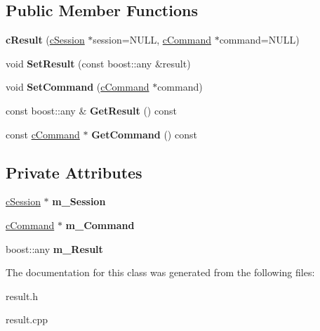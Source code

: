 \subsection*{\-Public \-Member \-Functions}
\begin{DoxyCompactItemize}
\item 
\hypertarget{classengine_1_1cResult_a31310dd255e30fdaeb34aa0e82c489f3}{
{\bfseries c\-Result} (\hyperlink{classengine_1_1cSession}{c\-Session} $\ast$session=\-N\-U\-L\-L, \hyperlink{classengine_1_1cCommand}{c\-Command} $\ast$command=\-N\-U\-L\-L)}
\label{classengine_1_1cResult_a31310dd255e30fdaeb34aa0e82c489f3}

\item 
\hypertarget{classengine_1_1cResult_ad72c10e84728768e45adbe9a653e4295}{
void {\bfseries \-Set\-Result} (const boost\-::any \&result)}
\label{classengine_1_1cResult_ad72c10e84728768e45adbe9a653e4295}

\item 
\hypertarget{classengine_1_1cResult_ae9d0c2817585874e55a9ba8483e9d0b7}{
void {\bfseries \-Set\-Command} (\hyperlink{classengine_1_1cCommand}{c\-Command} $\ast$command)}
\label{classengine_1_1cResult_ae9d0c2817585874e55a9ba8483e9d0b7}

\item 
\hypertarget{classengine_1_1cResult_ab1b5a9a971a31c6bfe9c1deeab868476}{
const boost\-::any \& {\bfseries \-Get\-Result} () const }
\label{classengine_1_1cResult_ab1b5a9a971a31c6bfe9c1deeab868476}

\item 
\hypertarget{classengine_1_1cResult_aa414e0f8b867fa54c6e836f0a67517b0}{
const \hyperlink{classengine_1_1cCommand}{c\-Command} $\ast$ {\bfseries \-Get\-Command} () const }
\label{classengine_1_1cResult_aa414e0f8b867fa54c6e836f0a67517b0}

\end{DoxyCompactItemize}
\subsection*{\-Private \-Attributes}
\begin{DoxyCompactItemize}
\item 
\hypertarget{classengine_1_1cResult_ab4a2a6e829775978c141dc4f18398321}{
\hyperlink{classengine_1_1cSession}{c\-Session} $\ast$ {\bfseries m\-\_\-\-Session}}
\label{classengine_1_1cResult_ab4a2a6e829775978c141dc4f18398321}

\item 
\hypertarget{classengine_1_1cResult_ae5500a8cd5d5c860c9c3c71a9bd687f1}{
\hyperlink{classengine_1_1cCommand}{c\-Command} $\ast$ {\bfseries m\-\_\-\-Command}}
\label{classengine_1_1cResult_ae5500a8cd5d5c860c9c3c71a9bd687f1}

\item 
\hypertarget{classengine_1_1cResult_a445a8b5495ec68e809fe85b5876a5bc7}{
boost\-::any {\bfseries m\-\_\-\-Result}}
\label{classengine_1_1cResult_a445a8b5495ec68e809fe85b5876a5bc7}

\end{DoxyCompactItemize}


\-The documentation for this class was generated from the following files\-:\begin{DoxyCompactItemize}
\item 
result.\-h\item 
result.\-cpp\end{DoxyCompactItemize}
